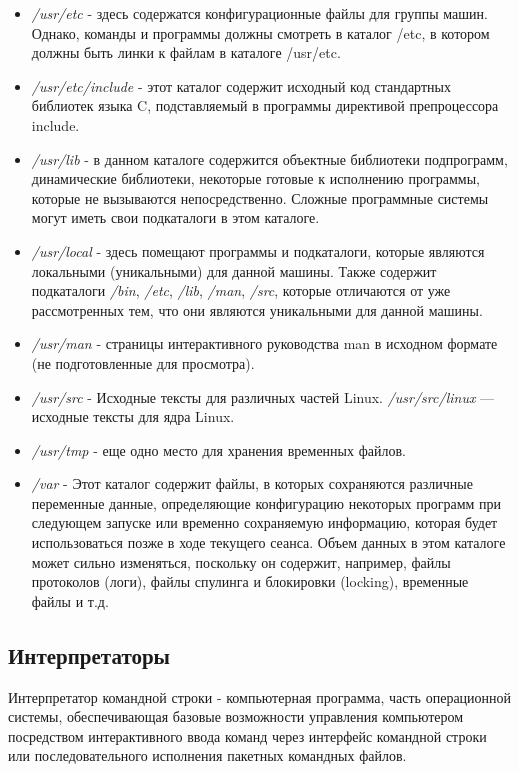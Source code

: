 \documentclass[14pt,a4paper,report]{report}
\begin{document}
\begin{itemize}
	\item \emph{/usr/etc} - здесь содержатся конфигурационные файлы для группы машин. Однако, команды и программы должны смотреть в каталог /etc, в котором должны быть линки к файлам в каталоге /usr/etc.
	\item \emph{/usr/etc/include} - этот каталог содержит исходный код стандартных библиотек языка C, подставляемый в программы директивой препроцессора include. 
	\item \emph{/usr/lib} - в данном каталоге содержится объектные библиотеки подпрограмм, динамические библиотеки, некоторые готовые к исполнению программы, которые не вызываются непосредственно. Сложные программные системы могут иметь свои подкаталоги в этом каталоге.
	\item \emph{/usr/local} - здесь помещают программы и подкаталоги, которые являются локальными (уникальными) для данной машины. Также содержит подкаталоги \emph{/bin}, \emph{/etc}, \emph{/lib}, \emph{/man}, \emph{/src}, которые отличаются от уже рассмотренных тем, что они являются уникальными для данной машины.
	\item \emph{/usr/man} - страницы интерактивного руководства man в исходном формате (не подготовленные для просмотра).
	\item \emph{/usr/src} - Исходные тексты для различных частей Linux. \emph{/usr/src/linux} — исходные тексты для ядра Linux.
	\item \emph{/usr/tmp} - еще одно место для хранения временных файлов. 
	\item \emph{/var} - Этот каталог содержит файлы, в которых сохраняются различные переменные данные, определяющие конфигурацию некоторых программ при следующем запуске или временно сохраняемую информацию, которая будет использоваться позже в ходе текущего сеанса. Объем данных в этом каталоге может сильно изменяться, поскольку он содержит, например, файлы протоколов (логи), файлы спулинга и блокировки (locking), временные файлы и т.д.
\end{itemize}

\subsection{Интерпретаторы}

Интерпретатор командной строки - компьютерная программа, часть операционной системы, обеспечивающая базовые возможности управления компьютером посредством интерактивного ввода команд через интерфейс командной строки или последовательного исполнения пакетных командных файлов.
\end{document}
